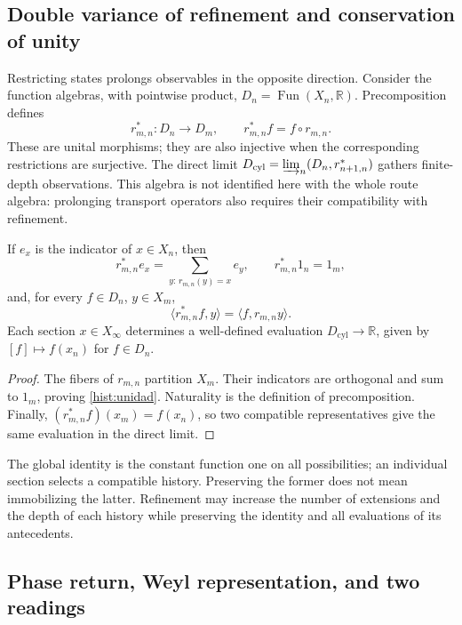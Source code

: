 \subsection{Double variance of refinement and conservation of unity}
\label{hist:doble-varianza}

Restricting states prolongs observables in the opposite direction.
Consider the function algebras, with pointwise product,
\(D_n=\operatorname{Fun}(X_n,\mathbb R)\). Precomposition defines
\begin{equation}
 r_{m,n}^*:D_n\longrightarrow D_m,
 \qquad r_{m,n}^*f=f\circ r_{m,n}.
 \label{hist:precomposicion}
\end{equation}
These are unital morphisms; they are also injective when the corresponding
restrictions are surjective. The direct limit
\(D_{\mathrm{cyl}}=\varinjlim_n(D_n,r_{n+1,n}^*)\) gathers
finite-depth observations. This algebra is not identified here with
the whole route algebra: prolonging transport operators also requires
their compatibility with refinement.

\begin{lemma}
If \(e_x\) is the indicator of \(x\in X_n\), then
\begin{equation}
 r_{m,n}^*e_x=\sum_{y:\,r_{m,n}(y)=x}e_y,
 \qquad r_{m,n}^*1_n=1_m,
 \label{hist:unidad}
\end{equation}
and, for every \(f\in D_n\), \(y\in X_m\),
\[
 \langle r_{m,n}^*f,y\rangle=\langle f,r_{m,n}y\rangle.
\]
Each section \(x\in X_\infty\) determines a well-defined evaluation
\(D_{\mathrm{cyl}}\to\mathbb R\), given by \([f]\mapsto f(x_n)\)
for \(f\in D_n\).
\end{lemma}
\begin{proof}
The fibers of \(r_{m,n}\) partition \(X_m\). Their indicators
are orthogonal and sum to \(1_m\), proving \eqref{hist:unidad}.
Naturality is the definition of precomposition. Finally,
\((r_{m,n}^*f)(x_m)=f(x_n)\), so two compatible representatives
give the same evaluation in the direct limit.
\end{proof}

The global identity is the constant function one on all possibilities;
an individual section selects a compatible history. Preserving the former
does not mean immobilizing the latter. Refinement may increase the number
of extensions and the depth of each history while preserving the identity
and all evaluations of its antecedents.

\subsection{Phase return, Weyl representation, and two readings}
\label{hist:puente-lecturas}

